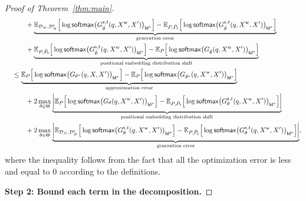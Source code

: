 \begin{proof}[Proof of Theorem~\ref{thm:main}]
\begin{align}
        &\quad\qquad + \underbrace{\mathbb{E}_{\mathcal{D}_N,\mathcal{D}_{N}^{t}}\Big[\log \mathsf{softmax}\big( G_{\hat{\theta}}^{\mathrm{s},t}(q,X^{\mathrm{w}},X^{\prime})\big)_{\mathsf{Id}^{*}}\Big] - \mathbb{E}_{P,\tilde{P}_{t}}\Big[\log \mathsf{softmax}\big( G_{\hat{\theta}}^{\mathrm{s},t}(q,X^{\mathrm{w}},X^{\prime})\big)_{\mathsf{Id}^{*}}\Big]}_{\text{generation error}}\nonumber\\
        &\quad\qquad + \underbrace{\mathbb{E}_{P,\tilde{P}_{t}}\Big[\log \mathsf{softmax}\big( G_{\hat{\theta}}^{\mathrm{s},t}(q,X^{\mathrm{w}},X^{\prime})\big)_{\mathsf{Id}^{*}}\Big]-\mathbb{E}_{P}\Big[\log \mathsf{softmax}\big( G_{\hat{\theta}}(q,X^{\mathrm{w}},X^{\prime})\big)_{\mathsf{Id}^{*}}\Big]}_{\text{positional embedding distribution shift}}\nonumber\\
        &\quad\leq\underbrace{\mathbb{E}_{P}\Big[\log \mathsf{softmax}\big( G_{\theta^{*}}(q,X,X^{\prime})\big)_{\mathsf{Id}^{*}}\Big] - \mathbb{E}_{P}\Big[\log \mathsf{softmax}\big( G_{\tilde{\theta}^{*}}(q,X^{\mathrm{w}},X^{\prime})\big)_{\mathsf{Id}^{*}}\Big]}_{\text{approximation error}}\nonumber\\
        &\quad\qquad + 2 \max_{\theta\in\Theta} \underbrace{\bigg|\mathbb{E}_{P}\Big[\log \mathsf{softmax}\big( G_{\theta}(q,X^{\mathrm{w}},X^{\prime})\big)_{\mathsf{Id}^{*}}\Big] -  \mathbb{E}_{P,\tilde{P}_{t}}\Big[\log \mathsf{softmax}\big( G_{\theta}^{\mathrm{s}, t}(q,X^{\mathrm{w}},X^{\prime})\big)_{\mathsf{Id}^{*}}\Big]\bigg|}_{\text{positional embedding distribution shift}}\nonumber\\
        &\quad\qquad + 2\max_{\theta\in\Theta}\underbrace{\bigg|\mathbb{E}_{\mathcal{D}_N,\mathcal{D}_{N}^{t}}\Big[\log \mathsf{softmax}\big( G_{\theta}^{\mathrm{s},t}(q,X^{\mathrm{w}},X^{\prime})\big)_{\mathsf{Id}^{*}}\Big] - \mathbb{E}_{P,\tilde{P}_{t}}\Big[\log \mathsf{softmax}\big( G_{\theta}^{\mathrm{s},t}(q,X^{\mathrm{w}},X^{\prime})\big)_{\mathsf{Id}^{*}}\Big]\bigg|}_{\text{generation error}},\label{eq:err_decomp}
    \end{align}
    where the inequality follows from the fact that all the optimization error is less and equal to $0$ according to the definitions.

    \textbf{Step 2: Bound each term in the decomposition.}


\end{proof}
